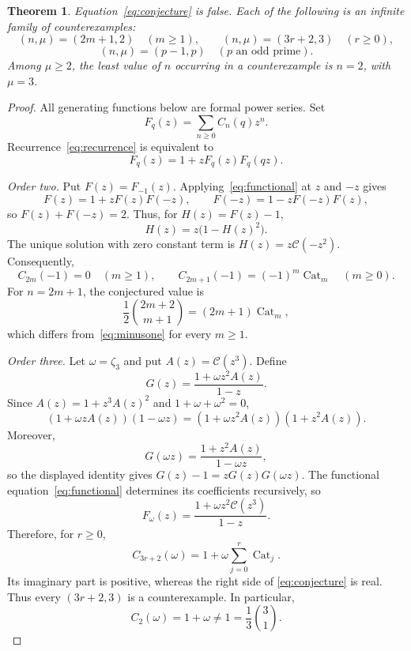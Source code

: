 \documentclass[11pt]{amsart}
\newtheorem{theorem}{Theorem}
\theoremstyle{remark}
\newcommand{\Cat}{\operatorname{Cat}}
\begin{document}
\begin{theorem}\label{thm:main}
Equation~\eqref{eq:conjecture} is false. Each of the following is an
infinite family of counterexamples:
\[
  (n,\mu)=(2m+1,2)\quad(m\ge1),
  \qquad
  (n,\mu)=(3r+2,3)\quad(r\ge0),
\]
\[
  (n,\mu)=(p-1,p)\quad(p\text{ an odd prime}).
\]
Among $\mu\ge2$, the least value of $n$ occurring in a counterexample
is $n=2$, with $\mu=3$.
\end{theorem}

\begin{proof}
All generating functions below are formal power series. Set
\[
  F_q(z)=\sum_{n\ge0}C_n(q)z^n.
\]
Recurrence~\eqref{eq:recurrence} is equivalent to
\begin{equation}\label{eq:functional}
  F_q(z)=1+zF_q(z)F_q(qz).
\end{equation}

\medskip
\noindent\emph{Order two.}
Put $F(z)=F_{-1}(z)$. Applying~\eqref{eq:functional} at $z$ and
$-z$ gives
\[
  F(z)=1+zF(z)F(-z),
  \qquad
  F(-z)=1-zF(-z)F(z),
\]
so $F(z)+F(-z)=2$. Thus, for $H(z)=F(z)-1$,
\[
  H(z)=z\bigl(1-H(z)^2\bigr).
\]
The unique solution with zero constant term is
$H(z)=z\mathcal C(-z^2)$. Consequently,
\begin{equation}\label{eq:minusone}
  C_{2m}(-1)=0\quad(m\ge1),
  \qquad
  C_{2m+1}(-1)=(-1)^m\Cat_m\quad(m\ge0).
\end{equation}
For $n=2m+1$, the conjectured value is
\[
  \frac12\binom{2m+2}{m+1}=(2m+1)\Cat_m,
\]
which differs from~\eqref{eq:minusone} for every $m\ge1$.

\medskip
\noindent\emph{Order three.}
Let $\omega=\zeta_3$ and put $A(z)=\mathcal C(z^3)$. Define
\[
  G(z)=\frac{1+\omega z^2A(z)}{1-z}.
\]
Since $A(z)=1+z^3A(z)^2$ and $1+\omega+\omega^2=0$,
\[
  (1+\omega zA(z))(1-\omega z)
  =(1+\omega z^2A(z))(1+z^2A(z)).
\]
Moreover,
\[
  G(\omega z)=\frac{1+z^2A(z)}{1-\omega z},
\]
so the displayed identity gives $G(z)-1=zG(z)G(\omega z)$. The
functional equation~\eqref{eq:functional} determines its coefficients
recursively, so
\begin{equation}\label{eq:omegaGF}
  F_\omega(z)=\frac{1+\omega z^2\mathcal C(z^3)}{1-z}.
\end{equation}
Therefore, for $r\ge0$,
\begin{equation}\label{eq:omegaeval}
  C_{3r+2}(\omega)
  =1+\omega\sum_{j=0}^{r}\Cat_j.
\end{equation}
Its imaginary part is positive, whereas the right side of
\eqref{eq:conjecture} is real. Thus every $(3r+2,3)$ is a
counterexample. In particular,
\[
  C_2(\omega)=1+\omega\ne1
  =\frac13\binom31.
\]


\end{proof}
\end{document}
